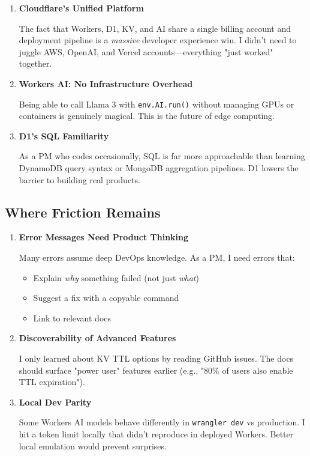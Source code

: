 \documentclass[11pt,a4paper]{article}
\begin{document}
\begin{enumerate}[leftmargin=*, itemsep=0.5em]
    \item \textbf{Cloudflare's Unified Platform}
    
    The fact that Workers, D1, KV, and AI share a single billing account and deployment pipeline is a \textit{massive} developer experience win. I didn't need to juggle AWS, OpenAI, and Vercel accounts—everything "just worked" together.
    
    \item \textbf{Workers AI: No Infrastructure Overhead}
    
    Being able to call Llama 3 with \texttt{env.AI.run()} without managing GPUs or containers is genuinely magical. This is the future of edge computing.
    
    \item \textbf{D1's SQL Familiarity}
    
    As a PM who codes occasionally, SQL is far more approachable than learning DynamoDB query syntax or MongoDB aggregation pipelines. D1 lowers the barrier to building real products.
\end{enumerate}

\subsection{Where Friction Remains}

\begin{enumerate}[leftmargin=*, itemsep=0.5em]
    \item \textbf{Error Messages Need Product Thinking}
    
    Many errors assume deep DevOps knowledge. As a PM, I need errors that:
    \begin{itemize}
        \item Explain \textit{why} something failed (not just \textit{what})
        \item Suggest a fix with a copyable command
        \item Link to relevant docs
    \end{itemize}
    
    \item \textbf{Discoverability of Advanced Features}
    
    I only learned about KV TTL options by reading GitHub issues. The docs should surface "power user" features earlier (e.g., "80\% of users also enable TTL expiration").
    
    \item \textbf{Local Dev Parity}
    
    Some Workers AI models behave differently in \texttt{wrangler dev} vs production. I hit a token limit locally that didn't reproduce in deployed Workers. Better local emulation would prevent surprises.
\end{enumerate}
\end{document}
